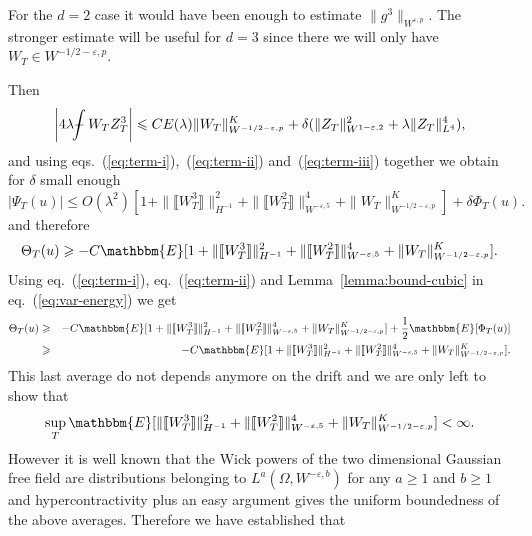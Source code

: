 \documentclass[11pt, oneside]{article}   	%
\def\Xint#1{\mathchoice
{\XXint\displaystyle\textstyle{#1}}%
{\XXint\textstyle\scriptstyle{#1}}%
{\XXint\scriptstyle\scriptscriptstyle{#1}}%
{\XXint\scriptscriptstyle\scriptscriptstyle{#1}}%
\!\int}
\def\XXint#1#2#3{{\setbox0=\hbox{$#1{#2#3}{\int}$ }
\vcenter{\hbox{$#2#3$ }}\kern-.6\wd0}}
\def\dashint{\Xint-}
\newcommand{\bint}{\dashint}
\begin{document}
\begin{remark}
  For the $d = 2$ case it would have been enough to estimate $\| g^3
  \|_{W^{\varepsilon, p}}$. The stronger estimate will be useful for $d = 3$
  since there we will only have $W_T \in W^{- 1 / 2 - \varepsilon, p}$.
\end{remark}

Then
\begin{equation}
  \left| 4 \lambda \bint W_T Z_T^3 \right| \leqslant C E (\lambda) \| W_T
  \|^K_{W^{- 1 / 2 - \varepsilon, p} } + \delta (\| Z_T \|^2_{W^{1 -
  \varepsilon, 2}} + \lambda \| Z_T \|^4_{L^4 }), \label{eq:term-iii}
\end{equation}
and using eqs.~(\ref{eq:term-i}),~(\ref{eq:term-ii}) and~(\ref{eq:term-iii})
together we obtain for $\delta$ small enough
\begin{equation}
  | \Psi_T (u) | \leqslant O (\lambda^2) [1 + \| \llbracket W_T^3 \rrbracket
  \|_{H^{- 1}}^2 + \| \llbracket W_T^2 \rrbracket \|^4_{W^{- \varepsilon, 5}}
  + \| W_T \|^K_{W^{- 1 / 2 - \varepsilon, p} }] + \delta \Phi_T (u) .
  \label{eq:bound-Psi}
\end{equation}
and therefore
\[ \Theta_T (u) \geqslant - C\mathbbm{E} [1 + \| \llbracket W_T^3 \rrbracket
   \|_{H^{- 1}}^2 + \| \llbracket W_T^2 \rrbracket \|^4_{W^{- \varepsilon, 5}}
   + \| W_T \|^K_{W^{- 1 / 2 - \varepsilon, p} }] . \]
Using eq.~(\ref{eq:term-i}), eq.~(\ref{eq:term-ii}) and
Lemma~\ref{lemma:bound-cubic} in eq.~(\ref{eq:var-energy}) we get
\begin{eqnarray*}
  \Theta_T (u) & \geqslant & - C\mathbbm{E} [1 + \| \llbracket W_T^3
  \rrbracket \|_{H^{- 1}}^2 + \| \llbracket W_T^2 \rrbracket \|^4_{W^{-
  \varepsilon, 5}} + \| W_T \|^K_{W^{- 1 / 2 - \varepsilon, p} }] +
  \frac{1}{2} \mathbbm{E} [\Phi_T (u)]\\
  & \geqslant & - C\mathbbm{E} [1 + \| \llbracket W_T^3 \rrbracket \|_{H^{-
  1}}^2 + \| \llbracket W_T^2 \rrbracket \|^4_{W^{- \varepsilon, 5}} + \| W_T
  \|^K_{W^{- 1 / 2 - \varepsilon, p} }] .
\end{eqnarray*}
This last average do not depends anymore on the drift and we are only left to
show that
\[ \sup_T \mathbbm{E} [\| \llbracket W_T^3 \rrbracket \|^2_{H^{- 1}} + \|
   \llbracket W_T^2 \rrbracket \|^4_{W^{- \varepsilon, 5}} + \| W_T \|^K_{W^{-
   1 / 2 - \varepsilon, p}}] < \infty . \]
However it is well known that the Wick powers of the two dimensional Gaussian
free field are distributions belonging to $L^a (\Omega, W^{- \varepsilon, b})$
for any $a \geqslant 1$ and $b \geqslant 1$ and hypercontractivity plus an
easy argument gives the uniform boundedness of the above averages. Therefore
we have established that
\end{document}
